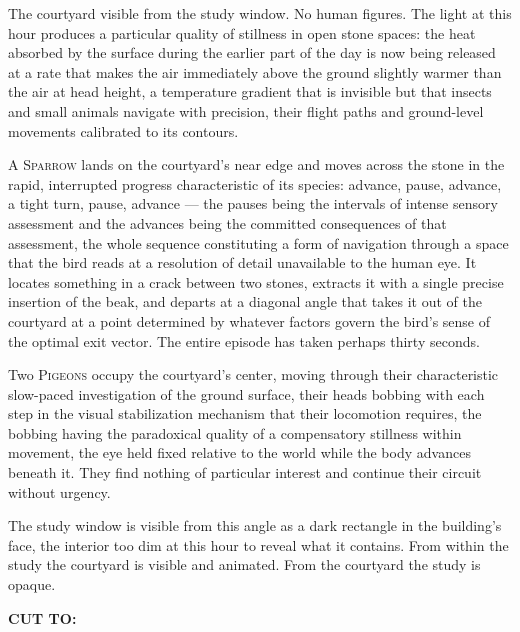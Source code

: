 \documentclass[12pt, oneside]{article}
\newenvironment{action}{%
  \vspace{0.6em}%
  \noindent\ignorespaces%
}{%
  \par\vspace{0.6em}%
}
\newcommand{\scenenumber}[1]{%
  \vspace{1em}%
  \noindent{\small\bfseries\scshape Scene #1}%
  \vspace{0.3em}\par%
}
\newcommand{\transition}[1]{%
  \vspace{0.8em}%
  \begin{flushright}%
    \bfseries #1%
  \end{flushright}%
  \vspace{0.5em}%
}
\begin{document}
\begin{action}
The courtyard visible from the study window. No human figures. The light at this hour produces a particular quality of stillness in open stone spaces: the heat absorbed by the surface during the earlier part of the day is now being released at a rate that makes the air immediately above the ground slightly warmer than the air at head height, a temperature gradient that is invisible but that insects and small animals navigate with precision, their flight paths and ground-level movements calibrated to its contours.

A \textsc{Sparrow} lands on the courtyard's near edge and moves across the stone in the rapid, interrupted progress characteristic of its species: advance, pause, advance, a tight turn, pause, advance --- the pauses being the intervals of intense sensory assessment and the advances being the committed consequences of that assessment, the whole sequence constituting a form of navigation through a space that the bird reads at a resolution of detail unavailable to the human eye. It locates something in a crack between two stones, extracts it with a single precise insertion of the beak, and departs at a diagonal angle that takes it out of the courtyard at a point determined by whatever factors govern the bird's sense of the optimal exit vector. The entire episode has taken perhaps thirty seconds.

Two \textsc{Pigeons} occupy the courtyard's center, moving through their characteristic slow-paced investigation of the ground surface, their heads bobbing with each step in the visual stabilization mechanism that their locomotion requires, the bobbing having the paradoxical quality of a compensatory stillness within movement, the eye held fixed relative to the world while the body advances beneath it. They find nothing of particular interest and continue their circuit without urgency.

The study window is visible from this angle as a dark rectangle in the building's face, the interior too dim at this hour to reveal what it contains. From within the study the courtyard is visible and animated. From the courtyard the study is opaque.
\end{action}

\transition{CUT TO:}

\scenenumber{16d — The Staged Argument}
\end{document}
